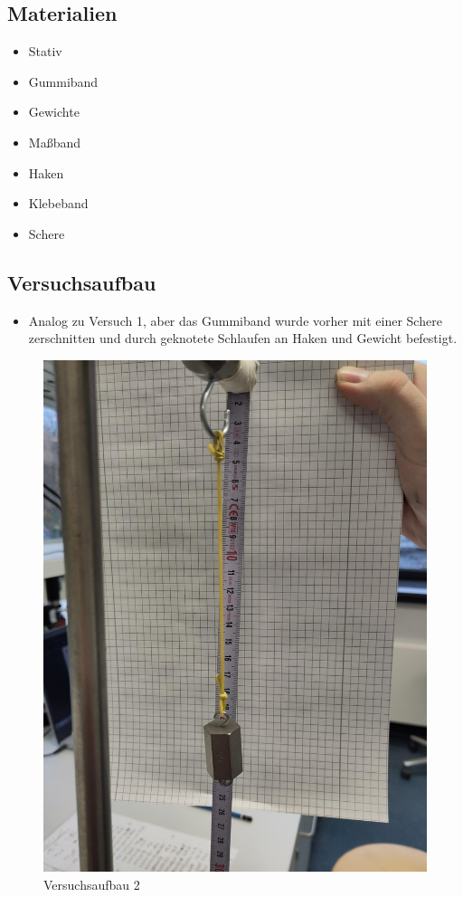 \documentclass[
]{article}
\providecommand{\tightlist}{%
  \setlength{\itemsep}{0pt}\setlength{\parskip}{0pt}}
\begin{document}
\hypertarget{materialien-1}{%
\subsection{Materialien}\label{materialien-1}}

\begin{itemize}
\tightlist
\item
  Stativ
\item
  Gummiband
\item
  Gewichte
\item
  Maßband
\item
  Haken
\item
  Klebeband
\item
  Schere
\end{itemize}

\hypertarget{versuchsaufbau-1}{%
\subsection{Versuchsaufbau}\label{versuchsaufbau-1}}

\begin{itemize}
\tightlist
\item
  Analog zu Versuch 1, aber das Gummiband wurde vorher mit einer Schere
  zerschnitten und durch geknotete Schlaufen an Haken und Gewicht
  befestigt.
\end{itemize}

\begin{figure}
\centering
\includegraphics{Bilder/V2B1.jpeg}
\caption{Versuchsaufbau 2}
\end{figure}
\end{document}
